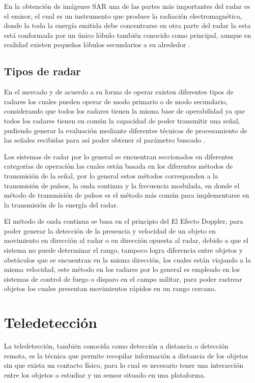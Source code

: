 En la obtención de imágenes SAR una de las partes más importantes del radar es el emisor, el cual es un instrumento que produce la radiación electromagnética, donde la toda la energía emitida debe concentrarse en otra parte del radar la esta está conformada por un único lóbulo también conocido como principal, aunque en realidad existen pequeños lóbulos secundarios a su alrededor \cite{RigoRibas2004}.

\subsection{Tipos de radar}	

En el mercado y de acuerdo a su forma de operar existen diferentes tipos de radares los cuales pueden operar de modo primario o de modo secundario, considerando que todos los radares tienen la misma base de operabilidad ya que todos los radares tienen en común la capacidad de poder transmitir una señal, pudiendo generar la evaluación mediante diferentes técnicas de procesamiento de las señales recibidas para así poder obtener el parámetro buscado \cite{AcostaOsorio2014Mar}. 

Los sistemas de radar por lo general se encuentran seccionados en diferentes categorías de operación las cuales están basada en los diferentes métodos de transmisión de la señal, por lo general estos métodos corresponden a la transmisión de pulsos, la onda continua y la frecuencia modulada, en donde el método de transmisión de pulsos es el método más común para implementarse en la transmisión de la energía del radar. 

El método de onda continua se basa en el principio del El Efecto Doppler, para poder generar la detección de la presencia y velocidad de un objeto en movimiento en dirección al radar o en dirección opuesta al radar, debido a que el sistema no puede determinar el rango, tampoco logra diferencia entre objetos y obstáculos que se encuentran en la misma dirección, los cuales están viajando a la misma velocidad, este método en los radares por lo general es empleado en los sistemas de control de fuego o disparo en el campo militar, para poder rastrear objetos los cuales presentan movimientos rápidos en un rango cercano.

\section{Teledetección}

La teledetección, también conocida como detección a distancia o detección remota, es la técnica que permite recopilar información a distancia de los objetos sin que exista un contacto físico, para lo cual es necesario tener una interacción entre los objetos a estudiar y un sensor situado en una plataforma.

